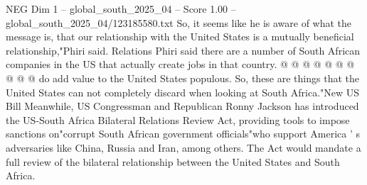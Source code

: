 \begin{textsample}{NEG Dim 1 – global\_south\_2025\_04 – Score 1.00 – global\_south\_2025\_04/123185580.txt}
So, it seems like he is aware of what the message is, that our relationship with the United States is a mutually beneficial relationship,"Phiri said.
Relations Phiri said there are a number of South African companies in the US that actually create jobs in that country. @ @ @ @ @ @ @ @ @ @ do add value to the United States populous.
So, these are things that the United States can not completely discard when looking at South Africa."New US Bill Meanwhile, US Congressman and Republican Ronny Jackson has introduced the US-South Africa Bilateral Relations Review Act, providing tools to impose sanctions on"corrupt South African government officials"who support America ' s adversaries like China, Russia and Iran, among others.
The Act would mandate a full review of the bilateral relationship between the United States and South Africa.

\end{textsample}
